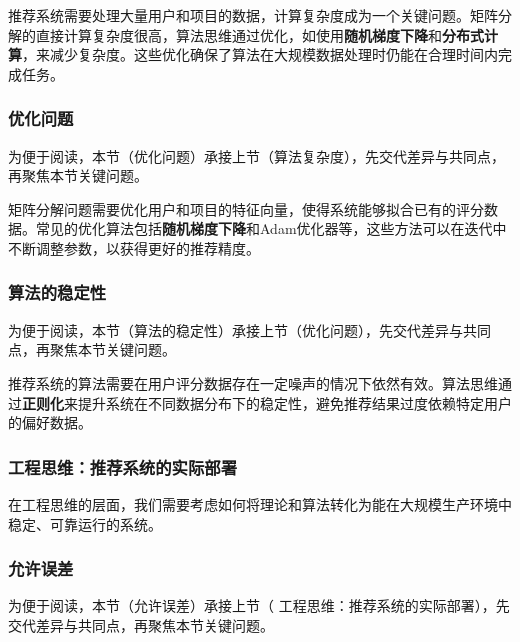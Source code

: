推荐系统需要处理大量用户和项目的数据，计算复杂度成为一个关键问题。矩阵分解的直接计算复杂度很高，算法思维通过优化，如使用{\bf 随机梯度下降}和{\bf 分布式计算}，来减少复杂度。这些优化确保了算法在大规模数据处理时仍能在合理时间内完成任务。
\subsubsection*{优化问题}


为便于阅读，本节（优化问题）承接上节（算法复杂度），先交代差异与共同点，再聚焦本节关键问题。

矩阵分解问题需要优化用户和项目的特征向量，使得系统能够拟合已有的评分数据。常见的优化算法包括{\bf 随机梯度下降}和{Adam}优化器等，这些方法可以在迭代中不断调整参数，以获得更好的推荐精度。
\subsubsection*{算法的稳定性}


为便于阅读，本节（算法的稳定性）承接上节（优化问题），先交代差异与共同点，再聚焦本节关键问题。

推荐系统的算法需要在用户评分数据存在一定噪声的情况下依然有效。算法思维通过{\bf 正则化}来提升系统在不同数据分布下的稳定性，避免推荐结果过度依赖特定用户的偏好数据。
\subsubsection{ 工程思维：推荐系统的实际部署}



在工程思维的层面，我们需要考虑如何将理论和算法转化为能在大规模生产环境中稳定、可靠运行的系统。
\subsubsection*{允许误差}


为便于阅读，本节（允许误差）承接上节（ 工程思维：推荐系统的实际部署），先交代差异与共同点，再聚焦本节关键问题。

